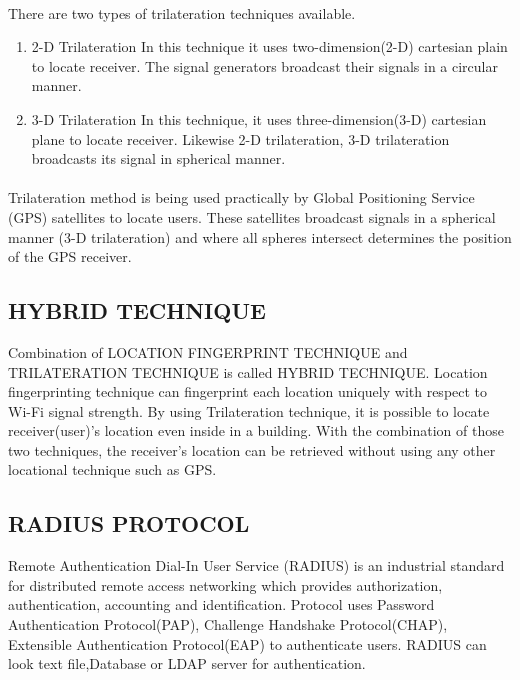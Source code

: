\paragraph{}
There are two types of trilateration techniques available.\cite{trilateration_2}
\begin{enumerate}
	\item 2-D Trilateration
		\subitem In this technique it uses two-dimension(2-D) cartesian plain to locate receiver. The signal generators broadcast their signals in a circular manner. 

	\item 3-D Trilateration
		\subitem In this technique, it uses three-dimension(3-D) cartesian plane to locate receiver. Likewise 2-D trilateration, 3-D trilateration broadcasts its signal in spherical manner.
\end{enumerate}

\paragraph{}
 Trilateration method is being used practically by Global Positioning Service (GPS) satellites to locate users. These satellites broadcast signals in a spherical manner (3-D trilateration) and where all spheres intersect determines the position of the GPS receiver. 
 
 \newpage
 \subsection{HYBRID TECHNIQUE}
 Combination of LOCATION FINGERPRINT TECHNIQUE and TRILATERATION TECHNIQUE is called HYBRID TECHNIQUE.\cite{hybrid_tech} Location fingerprinting technique can fingerprint each location uniquely with respect to Wi-Fi signal strength. By using Trilateration technique, it is possible to locate receiver(user)'s location even inside in a building. With the combination of those two techniques, the receiver's location can be retrieved without using any other locational technique such as GPS. 
 
 \subsection{RADIUS PROTOCOL}
 Remote Authentication Dial-In User Service (RADIUS) is an industrial standard for distributed remote access networking which provides authorization, authentication, accounting and identification.\cite{radius_protocol} Protocol uses Password Authentication Protocol(PAP), Challenge Handshake Protocol(CHAP), Extensible Authentication Protocol(EAP) to authenticate users. RADIUS can look text file,Database or LDAP server for authentication.
 
